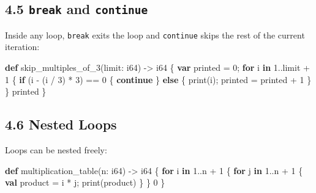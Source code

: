 \documentclass[
  english,
]{book}
\newenvironment{Shaded}{\begin{snugshade}}{\end{snugshade}}
\newcommand{\ControlFlowTok}[1]{\textcolor[rgb]{0.77,0.53,0.75}{\textbf{#1}}}
\newcommand{\DataTypeTok}[1]{\textcolor[rgb]{0.31,0.79,0.69}{#1}}
\newcommand{\DecValTok}[1]{\textcolor[rgb]{0.71,0.81,0.66}{#1}}
\newcommand{\FunctionTok}[1]{\textcolor[rgb]{0.86,0.86,0.67}{#1}}
\newcommand{\KeywordTok}[1]{\textcolor[rgb]{0.34,0.61,0.84}{\textbf{#1}}}
\newcommand{\NormalTok}[1]{\textcolor[rgb]{0.83,0.83,0.83}{#1}}
\newcommand{\OperatorTok}[1]{\textcolor[rgb]{0.83,0.83,0.83}{#1}}
\begin{document}
\subsection{\texorpdfstring{4.5 \texttt{break} and
\texttt{continue}}{4.5 break and continue}}\label{break-and-continue}

Inside any loop, \texttt{break} exits the loop and \texttt{continue}
skips the rest of the current iteration:

\begin{Shaded}
\begin{Highlighting}[]
\KeywordTok{def}\NormalTok{ skip\_multiples\_of\_3(limit: }\DataTypeTok{i64}\NormalTok{) }\OperatorTok{{-}\textgreater{}} \DataTypeTok{i64}\NormalTok{ \{}
    \KeywordTok{var}\NormalTok{ printed }\OperatorTok{=} \DecValTok{0}\NormalTok{;}
    \ControlFlowTok{for}\NormalTok{ i }\ControlFlowTok{in} \DecValTok{1}\OperatorTok{..}\NormalTok{limit }\OperatorTok{+} \DecValTok{1}\NormalTok{ \{}
        \ControlFlowTok{if}\NormalTok{ (i }\OperatorTok{{-}}\NormalTok{ (i }\OperatorTok{/} \DecValTok{3}\NormalTok{) }\OperatorTok{*} \DecValTok{3}\NormalTok{) }\OperatorTok{==} \DecValTok{0}\NormalTok{ \{}
            \ControlFlowTok{continue}
\NormalTok{        \} }\ControlFlowTok{else}\NormalTok{ \{}
            \FunctionTok{print}\NormalTok{(i);}
\NormalTok{            printed }\OperatorTok{=}\NormalTok{ printed }\OperatorTok{+} \DecValTok{1}
\NormalTok{        \}}
\NormalTok{    \}}
\NormalTok{    printed}
\NormalTok{\}}
\end{Highlighting}
\end{Shaded}

\subsection{4.6 Nested Loops}\label{nested-loops}

Loops can be nested freely:

\begin{Shaded}
\begin{Highlighting}[]
\KeywordTok{def}\NormalTok{ multiplication\_table(n: }\DataTypeTok{i64}\NormalTok{) }\OperatorTok{{-}\textgreater{}} \DataTypeTok{i64}\NormalTok{ \{}
    \ControlFlowTok{for}\NormalTok{ i }\ControlFlowTok{in} \DecValTok{1}\OperatorTok{..}\NormalTok{n }\OperatorTok{+} \DecValTok{1}\NormalTok{ \{}
        \ControlFlowTok{for}\NormalTok{ j }\ControlFlowTok{in} \DecValTok{1}\OperatorTok{..}\NormalTok{n }\OperatorTok{+} \DecValTok{1}\NormalTok{ \{}
            \KeywordTok{val}\NormalTok{ product }\OperatorTok{=}\NormalTok{ i }\OperatorTok{*}\NormalTok{ j;}
            \FunctionTok{print}\NormalTok{(product)}
\NormalTok{        \}}
\NormalTok{    \}}
    \DecValTok{0}
\NormalTok{\}}
\end{Highlighting}
\end{Shaded}
\end{document}
